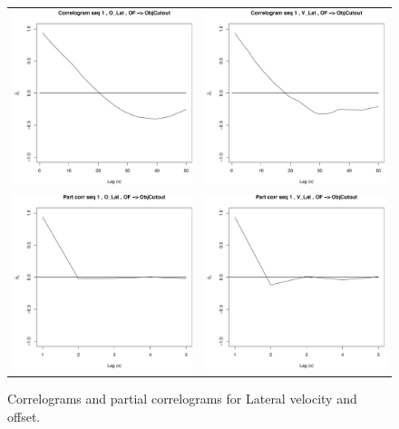 \begin{figure}
  \centering
    \begin{tabular}{cc}
    \includegraphics[width=60mm]{figures/DaimlerCorrOBJ_R50Offs.pdf}&
    \includegraphics[width=60mm]{figures/DaimlerCorrOBJ_R50Vel.pdf}\\
        \includegraphics[width=60mm]{figures/DaimlerPcorrOBJ_R5Offs.pdf}&
    \includegraphics[width=60mm]{figures/DaimlerPcorrOBJ_R5Vel.pdf}\\
  \end{tabular}
    \caption{\label{Figure:daimlerCorrel}Correlograms and partial correlograms for Lateral velocity and offset.}
\end{figure}



